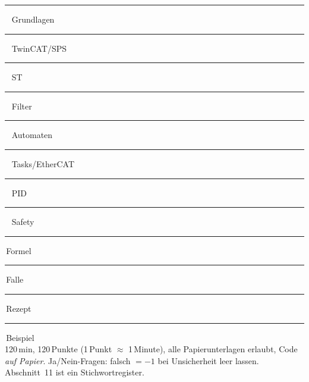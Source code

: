 
\begin{tcolorbox}[zfbox, colback=black!2, colframe=black!45,
  coltitle=white, colbacktitle=black!45, title={Farbcode der Blöcke}]
\textcolor{cB1}{\rule{7pt}{7pt}}~ Grundlagen \quad
\textcolor{cB2}{\rule{7pt}{7pt}}~ TwinCAT/SPS \quad
\textcolor{cB3}{\rule{7pt}{7pt}}~ ST \quad
\textcolor{cB4}{\rule{7pt}{7pt}}~ Filter \\
\textcolor{cB5}{\rule{7pt}{7pt}}~ Automaten \quad
\textcolor{cB6}{\rule{7pt}{7pt}}~ Tasks/EtherCAT \quad
\textcolor{cB7}{\rule{7pt}{7pt}}~ PID \quad
\textcolor{cB8}{\rule{7pt}{7pt}}~ Safety \\[3pt]
\textcolor{cREF}{\rule{7pt}{7pt}}\,Formel \;
\textcolor{red!65}{\rule{7pt}{7pt}}\,Falle \;
\textcolor{green!40!black}{\rule{7pt}{7pt}}\,Rezept \;
\textcolor{black!55}{\rule{7pt}{7pt}}\,Beispiel \\[3pt]
 120\,min, 120\,Punkte (1\,Punkt $\approx$ 1\,Minute), alle
Papierunterlagen erlaubt, Code \emph{auf Papier}. Ja/Nein-Fragen:
falsch $=-1$ \ra bei Unsicherheit leer lassen.
Abschnitt~11 ist ein Stichwortregister.
\end{tcolorbox}

